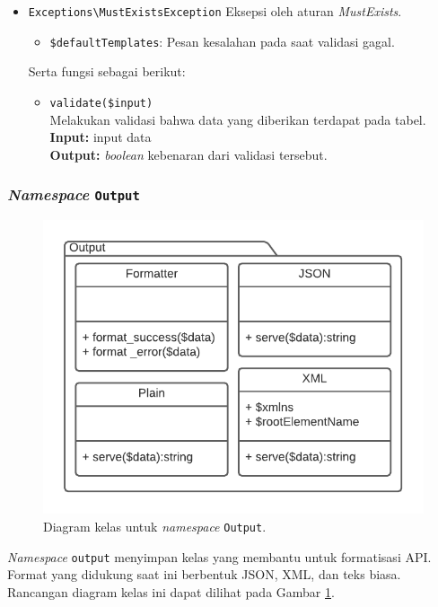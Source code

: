 \begin{itemize}
        \item \texttt{Exceptions\textbackslash MustExistsException} Eksepsi oleh
            aturan \textit{MustExists}.
            \begin{itemize}
                \item \texttt{\$defaultTemplates}: Pesan kesalahan pada saat
                validasi gagal.
            \end{itemize}
            Serta fungsi sebagai berikut:
            \begin{itemize}
                \item \texttt{validate(\$input)} \\
                    Melakukan validasi bahwa data yang diberikan terdapat pada
                    tabel.\\
                    \textbf{Input:} input data\\
                    \textbf{Output:} \textit{boolean} kebenaran dari validasi
                    tersebut.
            \end{itemize}
    \end{itemize}

\subsubsection{\textit{Namespace} \texttt{Output}}
    \begin{figure}
        \centering
        \includegraphics{Gambar/classmap-be/Classmap - app-output.pdf}
        \caption{Diagram kelas untuk \textit{namespace} \texttt{Output}.}
        \label{fig:classmap_app-output}
    \end{figure}
    \textit{Namespace} \texttt{output} menyimpan kelas yang membantu untuk
    formatisasi API. Format yang didukung saat ini berbentuk JSON, XML, dan teks
    biasa. Rancangan diagram kelas ini dapat dilihat pada Gambar
    \ref{fig:classmap_app-output}.
    
